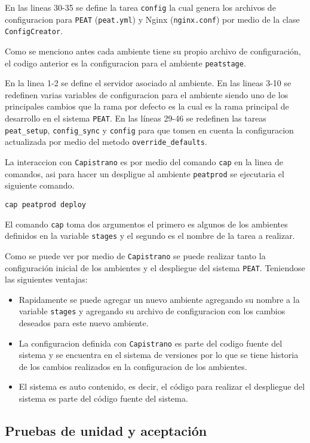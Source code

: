 En las lineas 30-35 se define la tarea \texttt{config} la cual genera
los archivos de configuracion para \texttt{PEAT} (\texttt{peat.yml}) y
Nginx (\texttt{nginx.conf}) por medio de la clase \texttt{ConfigCreator}.



Como se menciono antes cada ambiente tiene su propio archivo de configuración,
el codigo anterior es la configuracion para el ambiente \texttt{peatstage}.

En la linea 1-2 se define el servidor asociado al ambiente. En las lineas
3-10 se redefinen varias variables de configuracion para el ambiente siendo uno
de los principales cambios que la rama por defecto es  la
cual es la rama principal de desarrollo en el sistema \texttt{PEAT}.
En las líneas 29-46 se redefinen las tareas \texttt{peat\_setup},
\texttt{config\_sync} y \texttt{config} para que tomen en cuenta la configuracion
actualizada por medio del metodo \texttt{override\_defaults}.

La interaccion con \texttt{Capistrano} es por medio del comando \texttt{cap}
en la linea de comandos, asi para hacer un despligue al ambiente \texttt{peatprod}
se ejecutaria el siguiente comando.

\begin{verbatim}
cap peatprod deploy
\end{verbatim}

El comando \texttt{cap} toma dos argumentos el primero es algunos de los
ambientes definidos en la variable \texttt{stages} y el segundo es el nombre
de la tarea a realizar.

Como se puede ver por medio de \texttt{Capistrano} se puede realizar tanto
la configuración inicial de los ambientes y el despliegue del sistema \texttt{PEAT}.
Teniendose las siguientes ventajas:

\begin{itemize}
\item Rapidamente se puede agregar un nuevo ambiente agregando su nombre a la
  variable \texttt{stages} y agregando su archivo de configuracion con los
  cambios deseados para este nuevo ambiente.
\item La configuracion definida con \texttt{Capistrano} es parte del codigo fuente
  del sistema y se encuentra en el sistema de versiones por lo que se tiene historia
  de los cambios realizados en la configuracion de los ambientes.
\item El sistema es auto contenido, es decir, el código para realizar el despliegue
  del sistema es parte del código fuente del sistema.
\end{itemize}

\subsection{Pruebas de unidad y aceptación}

